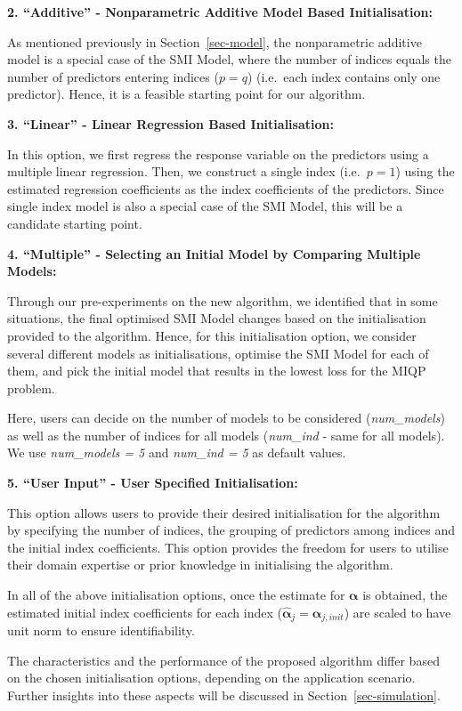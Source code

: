 \documentclass[
  11pt,
  a4paper,
]{article}
\begin{document}
\textbf{2. ``Additive'' - Nonparametric Additive Model Based
Initialisation:}

As mentioned previously in Section~\ref{sec-model}, the nonparametric
additive model is a special case of the SMI Model, where the number of
indices equals the number of predictors entering indices (\(p = q\))
(i.e.~each index contains only one predictor). Hence, it is a feasible
starting point for our algorithm.

\textbf{3. ``Linear'' - Linear Regression Based Initialisation:}

In this option, we first regress the response variable on the predictors
using a multiple linear regression. Then, we construct a single index
(i.e.~\(p = 1\)) using the estimated regression coefficients as the
index coefficients of the predictors. Since single index model is also a
special case of the SMI Model, this will be a candidate starting point.

\textbf{4. ``Multiple'' - Selecting an Initial Model by Comparing
Multiple Models:}

Through our pre-experiments on the new algorithm, we identified that in
some situations, the final optimised SMI Model changes based on the
initialisation provided to the algorithm. Hence, for this initialisation
option, we consider several different models as initialisations,
optimise the SMI Model for each of them, and pick the initial model that
results in the lowest loss for the MIQP problem.

Here, users can decide on the number of models to be considered
(\emph{num\_models}) as well as the number of indices for all models
(\emph{num\_ind} - same for all models). We use \emph{num\_models = 5}
and \emph{num\_ind = 5} as default values.

\textbf{5. ``User Input'' - User Specified Initialisation:}

This option allows users to provide their desired initialisation for the
algorithm by specifying the number of indices, the grouping of
predictors among indices and the initial index coefficients. This option
provides the freedom for users to utilise their domain expertise or
prior knowledge in initialising the algorithm.

In all of the above initialisation options, once the estimate for
\(\bm{\alpha}\) is obtained, the estimated initial index coefficients
for each index (\(\hat{\bm{\alpha}}_{j} = \bm{\alpha}_{j, init}\)) are
scaled to have unit norm to ensure identifiability.

The characteristics and the performance of the proposed algorithm differ
based on the chosen initialisation options, depending on the application
scenario. Further insights into these aspects will be discussed in
Section~\ref{sec-simulation}.
\end{document}
